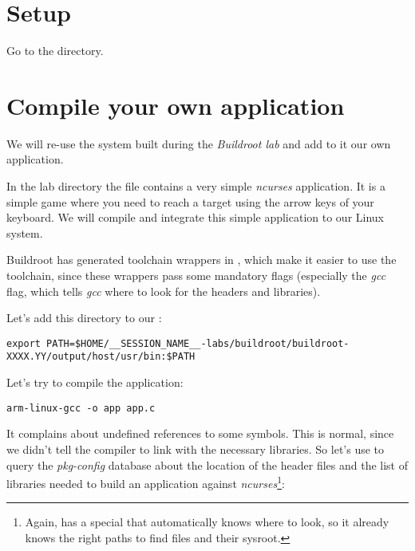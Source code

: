 
\section{Setup}

Go to the  directory.

\section{Compile your own application}

We will re-use the system built during the {\em Buildroot lab} and add
to it our own application.

In the lab directory the file  contains a very simple
{\em ncurses} application. It is a simple game where you need to reach
a target using the arrow keys of your keyboard.  We will compile and
integrate this simple application to our Linux system.

Buildroot has generated toolchain wrappers in
, which make it easier to use the toolchain,
since these wrappers pass some mandatory flags (especially the
 {\em gcc} flag, which tells {\em gcc} where to look
for the headers and libraries).

Let's add this directory to our :

\footnotesize
\begin{verbatim}
export PATH=$HOME/__SESSION_NAME__-labs/buildroot/buildroot-XXXX.YY/output/host/usr/bin:$PATH
\end{verbatim}
\normalsize

Let's try to compile the application:

\begin{verbatim}
arm-linux-gcc -o app app.c
\end{verbatim}

It complains about undefined references to some symbols. This is
normal, since we didn't tell the compiler to link with the necessary
libraries. So let's use  to query the {\em
pkg-config} database about the location of the header files and the
list of libraries needed to build an application against
{\em ncurses}\footnote{Again,  has a special
 that automatically knows where to look, so it
already knows the right paths to find  files and their
sysroot.}:

